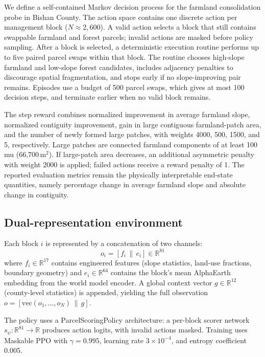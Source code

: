 \documentclass{article}
\begin{document}
We define a self-contained Markov decision process for the farmland consolidation probe in Bishan County. The action space contains one discrete action per management block ($N \approx 2{,}600$). A valid action selects a block that still contains swappable farmland and forest parcels; invalid actions are masked before policy sampling. After a block is selected, a deterministic execution routine performs up to five paired parcel swaps within that block. The routine chooses high-slope farmland and low-slope forest candidates, includes adjacency penalties to discourage spatial fragmentation, and stops early if no slope-improving pair remains. Episodes use a budget of 500 parcel swaps, which gives at most 100 decision steps, and terminate earlier when no valid block remains.

The step reward combines normalized improvement in average farmland slope, normalized contiguity improvement, gain in large contiguous farmland-patch area, and the number of newly formed large patches, with weights 4000, 500, 1500, and 5, respectively. Large patches are connected farmland components of at least 100 mu (66{,}700\,m$^2$). If large-patch area decreases, an additional asymmetric penalty with weight 2000 is applied; failed actions receive a reward penalty of 1. The reported evaluation metrics remain the physically interpretable end-state quantities, namely percentage change in average farmland slope and absolute change in contiguity.

\subsection{Dual-representation environment}

Each block $i$ is represented by a concatenation of two channels:
\begin{equation}
o_i = [f_i \,\|\, e_i] \in \mathbb{R}^{81}
\end{equation}
where $f_i \in \mathbb{R}^{17}$ contains engineered features (slope statistics, land-use fractions, boundary geometry) and $e_i \in \mathbb{R}^{64}$ contains the block's mean AlphaEarth embedding from the world model encoder. A global context vector $g \in \mathbb{R}^{12}$ (county-level statistics) is appended, yielding the full observation $o = [\text{vec}(o_1, \ldots, o_N) \,\|\, g]$.

The policy uses a ParcelScoringPolicy architecture: a per-block scorer network $s_\psi: \mathbb{R}^{81} \to \mathbb{R}$ produces action logits, with invalid actions masked. Training uses Maskable PPO \citep{huang2022maskableppo} with $\gamma = 0.995$, learning rate $3 \times 10^{-4}$, and entropy coefficient 0.005.
\end{document}
